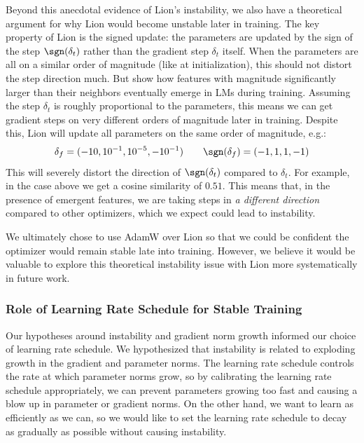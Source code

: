 Beyond this anecdotal evidence of Lion's instability, we also have a theoretical argument for why Lion would become unstable later in training.
The key property of Lion is the signed update: the parameters are updated by the sign of the step $\sgn(\delta_t)$ rather than the gradient step $\delta_t$ itself.
When the parameters are all on a similar order of magnitude (like at initialization), this should not distort the step direction much.
But \citet{dettmers2022llmint8} show how features with magnitude significantly larger than their neighbors eventually emerge in LMs during training. Assuming the step $\delta_t$ is roughly proportional to the parameters, this means we can get gradient steps on very different orders of magnitude later in training.
Despite this, Lion will update all parameters on the same order of magnitude, e.g.:
\begin{align*}
    \delta_f = (-10, 10^{-1}, 10^{-5}, -10^{-1}) \quad \quad
    \sgn(\delta_f) = (-1, 1, 1, -1)
\end{align*}
This will severely distort the direction of $\sgn(\delta_t)$ compared to $\delta_t$. For example, in the case above we get a cosine similarity of $0.51$. This means that, in the presence of emergent features, we are taking steps in \emph{a different direction} compared to other optimizers, which we expect could lead to instability.

We ultimately chose to use AdamW over Lion so that we could be confident the optimizer would remain stable late into training. However, we believe it would be valuable to explore this theoretical instability issue with Lion more systematically in future work.

\subsubsection{Role of Learning Rate Schedule for Stable Training}

Our hypotheses around instability and gradient norm growth informed our choice of learning rate schedule. We hypothesized that instability is related to exploding growth in the gradient and parameter norms. The learning rate schedule controls the rate at which parameter norms grow, so by calibrating the learning rate schedule appropriately, we can prevent parameters growing too fast and causing a blow up in parameter or gradient norms. On the other hand, we want to learn as efficiently as we can, so we would like to set the learning rate schedule to decay as gradually as possible without causing instability.

